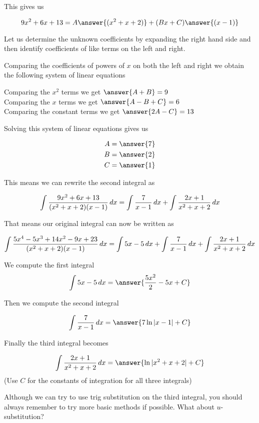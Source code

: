 \documentclass{ximera}
\begin{document}
\begin{exercise}
\begin{exercise}
\begin{exercise}
This gives us 

\[
9x^{2}+6x+13=A\answer{(x^{2}+x+2)} + (Bx+C)\answer{(x-1)}
\]

Let us determine the unknown coefficients by expanding the right hand side and then identify coefficients of like terms on the left and right.



Comparing the coefficients of powers of $x$ on both the left and right we obtain the following system of linear equations


Comparing the $x^{2}$ terms we get $\answer {A+B}=9$ \\
Comparing the $x$ terms we get $\answer{A-B+C}=6$ \\
Comparing the constant terms we get $\answer{2A-C}=13$ 

\begin{exercise}
Solving this system of linear equations gives us

\begin{align}
A&=\answer{ 7 }\\
B&=\answer{2  }\\
C&=\answer{ 1 }
\end{align}





\begin{exercise}
This means we can  rewrite the second integral as

\[
\int \frac{9x^{2}+6x+13}{(x^{2}+x+2)(x-1)} \mathop{}\!d x= \int \frac{7}{x-1} \mathop{}\!d x + \int \frac{2x+1}{x^{2}+x+2} \mathop{}\!d x
\]

 That means our original integral can now be written as 

\[
\int \frac{5x^{4}-5x^{3}+14x^{2}-9x+23}{(x^{2}+x+2)(x-1)} \mathop{}\!d x= \int 5x-5 \mathop{}\!d x + \int \frac{7}{x-1} \mathop{}\!d x +
\int \frac{2x+1}{x^{2}+x+2} \mathop{}\!d x 
\]

We compute the first integral 
\[
\int 5x-5 \d x =\answer{ \frac{5x^{2}}{2} - 5x +C }
\]

Then we compute the second integral 

\[
\int \frac{7}{x-1} \d x= \answer{ 7\ln|x-1|+C }
\]

Finally the third integral becomes 

\[
\int \frac{2x+1}{x^{2}+x+2} \d x=\answer{ \ln| x^{2}+x+2 | + C}
\]
(Use $C$ for the constants of integration for all three integrals)

\begin{hint}
Although we can try to use trig substitution on the third integral, you should always remember to try more basic
methods if possible. What about $u$-substitution?
\end{hint}


\end{exercise}
\end{exercise}
\end{exercise}
\end{exercise}
\end{exercise}
\end{document}
